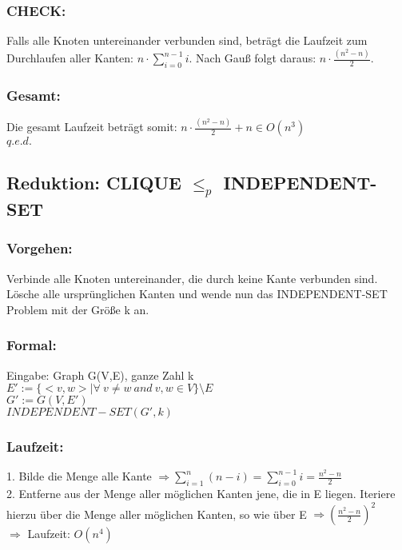 \documentclass[a4paper,11pt,twoside]{article}
\begin{document}
\subsubsection*{CHECK:}
Falls alle Knoten untereinander verbunden sind, beträgt die Laufzeit zum Durchlaufen aller Kanten: $n \cdot \sum_{i=0}^{n-1} i$. Nach Gauß folgt daraus: $n \cdot \frac{(n^2-n)}{2}$. 

\subsubsection*{Gesamt:}
Die gesamt Laufzeit beträgt somit: $n \cdot \frac{(n^2-n)}{2} + n \in O(n^3)$ \\
$q.e.d.$  


\subsection*{Reduktion: CLIQUE $\leq_p $ INDEPENDENT-SET}
\subsubsection*{Vorgehen:}
Verbinde alle Knoten untereinander, die durch keine Kante verbunden sind. Lösche alle ursprünglichen Kanten und wende nun das INDEPENDENT-SET Problem mit der Größe k an. \\

\subsubsection*{Formal:} 
Eingabe: Graph G(V,E), ganze Zahl k \\

$E' := \{<v,w> | \forall~ v \not= w ~and ~v,w \in V \} \setminus E$\\
$G' := G(V, E')$\\
$ INDEPENDENT-SET(G', k)$
 
 \subsubsection*{Laufzeit:} 

1. Bilde die Menge alle Kante $\Rightarrow \sum_{i=1}^n(n-i) = \sum_{i=0}^{n-1} i = \frac{n^2-n}{2}$ \\
2. Entferne aus der Menge aller möglichen Kanten jene, die in E liegen. Iteriere hierzu über die Menge aller möglichen Kanten, so wie über E $\Rightarrow (\frac{n^2-n}{2})^2$ \\
$\Rightarrow$ Laufzeit: $O(n^4)$
\end{document}
